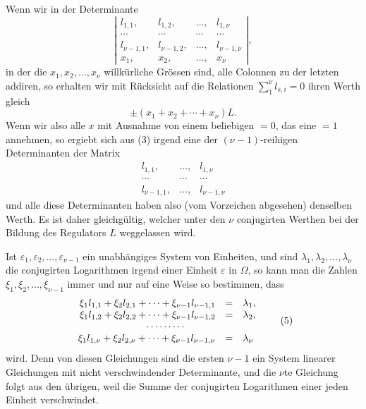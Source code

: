 \documentclass[11pt]{article}
\begin{document}
Wenn wir in der Determinante
\begin{equation}
\left|\begin{array}{cccc}
l_{1,1},&l_{1,2},&\ldots,&l_{1,\nu}\\
\cdots&\cdots&\cdots&\cdots\\
l_{\nu-1,1},&l_{\nu-1,2},&\ldots,&l_{\nu-1,\nu}\\
x_1,&x_2,&\ldots,&x_\nu
\end{array}\right|,
\tag{4}
\end{equation}
in der die $x_1,x_2,\ldots,x_\nu$ willkürliche Grössen sind, alle Colonnen zu der letzten addiren, so erhalten wir mit Rücksicht auf die Relationen $\sum_{1}^{\nu}l_{s,i}=0$ ihren Werth gleich
\[
\pm(x_1+x_2+\cdots+x_\nu)L.
\]
Wenn wir also alle $x$ mit Ausnahme von einem beliebigen
$=0$, das eine $=1$ annehmen, so ergiebt sich aus (3) irgend eine der $(\nu-1)$-reihigen Determinanten der Matrix
\[
\begin{array}{ccc}
l_{1,1},&\ldots,&l_{1,\nu}\\
\cdots&\cdots&\cdots\\
l_{\nu-1,1},&\ldots,&l_{\nu-1,\nu}
\end{array}
\]
und alle diese Determinanten haben also (vom Vorzeichen abgesehen) denselben Werth. Es ist daher gleichgültig, welcher unter den $\nu$ conjugirten Werthen bei der Bildung des Regulators $L$ weggelassen wird.

Ist $\varepsilon_1,\varepsilon_2,\ldots,\varepsilon_{\nu-1}$ ein unabhängiges System von Einheiten, und sind $\lambda_1,\lambda_2,\ldots,\lambda_\nu$ die conjugirten Logarithmen irgend einer Einheit $\varepsilon$ in $\Omega$, so kann man die Zahlen $\xi_1,\xi_2,\ldots,\xi_{\nu-1}$ immer und nur auf eine Weise so bestimmen, dass
\begin{equation}
\begin{array}{rcl}
\xi_1l_{1,1}+\xi_2l_{2,1}+\cdots+\xi_{\nu-1}l_{\nu-1,1}&=&\lambda_1,\\
\xi_1l_{1,2}+\xi_2l_{2,2}+\cdots+\xi_{\nu-1}l_{\nu-1,2}&=&\lambda_2,\\
\multicolumn{3}{c}{\cdots\cdots\cdots}\,\\
\xi_1l_{1,\nu}+\xi_2l_{2,\nu}+\cdots+\xi_{\nu-1}l_{\nu-1,\nu}&=&\lambda_\nu
\end{array}
\tag{5}
\end{equation}
wird. Denn von diesen Gleichungen sind die ersten $\nu-1$ ein System linearer Gleichungen mit nicht verschwindender Determinante, und die $\nu$te Gleichung folgt aus den übrigen, weil die Summe der conjugirten Logarithmen einer jeden Einheit verschwindet.
\end{document}
